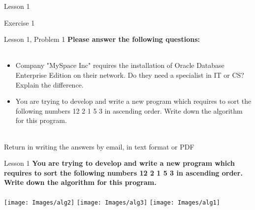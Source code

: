 \documentclass[aspectratio=1610]{beamer}
\begin{document}
\begin{frame}{Lesson 1}{}
\begin{center}
\Huge Exercise 1
\end{center}
\end{frame}

\begin{frame}{Lesson 1, Problem 1}{}
\Large
\textbf{Please answer the following questions:}\\~\\ 

\Large{
\begin{itemize}
    \item Company "MySpace Inc" requires the installation of Oracle Database Enterprise Edition on their network. Do they need a specialist in IT or CS? Explain the difference.
    \item You are trying to develop and write a new program which requires to sort the following numbers 12 2 1 5 3 in ascending order. Write down the algorithm for this program. \\~\\
\end{itemize}}
Return in writing the answers by email, in text format or PDF
\end{frame}


\begin{frame}{Lesson 1}{}
\Large
\textbf{You are trying to develop and write a new program which requires to sort the following numbers 12 2 1 5 3 in ascending order. Write down the algorithm for this program.}\\~\\ 
\texttt{[image: Images/alg2]}
\texttt{[image: Images/alg3]}
\texttt{[image: Images/alg1]}
\end{frame}
\end{document}
